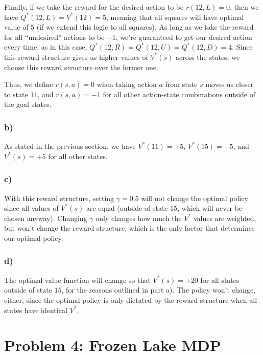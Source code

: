 \documentclass[11pt]{scrartcl}
\begin{document}
Finally, if we take the reward for the desired action to be $r(12,L) = 0$, then we have $Q^{*}(12,L) = V^{*}(12)=5$, meaning that all squares will have optimal value of $5$ (if we extend this logic to all squares). As long as we take the reward for all ``undesired'' actions to be $-1$, we're guaranteed to get our desired action every time, as in this case, $Q^{*}(12,R)=Q^{*}(12,U)=Q^{*}(12,D)=4$. Since this reward structure gives us higher values of $V^{*}(s)$ across the states, we choose this reward structure over the former one.

Thus, we define $r(s,a) = 0$ when taking action $a$ from state $s$ moves us closer to state $11$, and $r(s,a) = -1$ for all other action-state combinations outside of the goal states.

\subsubsection*{b)}
As stated in the previous section, we have $V^{*}(11) = +5$, $V^{*}(15) = -5$, and $V^{*}(s) = +5$ for all other states.

\subsubsection*{c)}
With this reward structure, setting $\gamma = 0.5$ will not change the optimal policy since all values of $V^{*}(s)$ are equal (outside of state 15, which will never be chosen anyway). Changing $\gamma$ only changes how much the $V^{*}$ values are weighted, but won't change the reward structure, which is the only factor that determines our optimal policy.

\subsubsection*{d)}
The optimal value function will change so that $V^{*}(s) = +20$ for all states outside of state $15$, for the reasons outlined in part a). The policy won't change, either, since the optimal policy is only dictated by the reward structure when all states have identical $V^{*}$.

\section*{Problem 4: Frozen Lake MDP}
\end{document}
